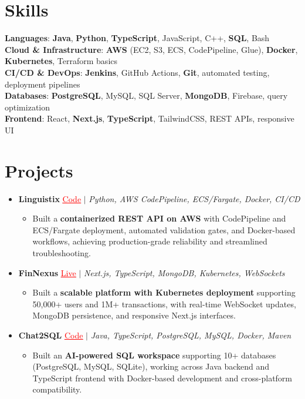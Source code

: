 \documentclass[letterpaper,10pt]{article}
\newcommand{\resumeItem}[1]{\item\small{{#1 \vspace{-2pt}}}}
\newcommand{\resumeProjectHeading}[1]{\item \small #1 \vspace{-2pt}}
\newcommand{\resumeSubHeadingListStart}{\begin{itemize}[leftmargin=0.0in, label={}]}
\newcommand{\resumeSubHeadingListEnd}{\end{itemize}}
\newcommand{\resumeProjItemListStart}{\begin{itemize}[leftmargin=0.15in,label=\textbullet,itemsep=0pt,topsep=0pt,parsep=0pt,partopsep=0pt]}
\newcommand{\resumeProjItemListEnd}{\end{itemize}\vspace{-4pt}}
\begin{document}
\section{Skills}
\begin{itemize}[leftmargin=0.15in, label={}]
\small{\item{
\textbf{Languages}: \textbf{Java}, \textbf{Python}, \textbf{TypeScript}, JavaScript, C++, \textbf{SQL}, Bash \\
\textbf{Cloud \& Infrastructure}: \textbf{AWS} (EC2, S3, ECS, CodePipeline, Glue), \textbf{Docker}, \textbf{Kubernetes}, Terraform basics \\
\textbf{CI/CD \& DevOps}: \textbf{Jenkins}, GitHub Actions, \textbf{Git}, automated testing, deployment pipelines \\
\textbf{Databases}: \textbf{PostgreSQL}, MySQL, SQL Server, \textbf{MongoDB}, Firebase, query optimization \\
\textbf{Frontend}: React, \textbf{Next.js}, \textbf{TypeScript}, TailwindCSS, REST APIs, responsive UI
}}
\end{itemize}
\vspace{-16pt}
\section{Projects}
\resumeSubHeadingListStart
\vspace{-2pt}
\resumeProjectHeading{\textbf{Linguistix} {\href{https://github.com/SAHAJ-BHADJA/Linguistix}{\textcolor{red}{\underline{Code}}}} $|$ \emph{Python, AWS CodePipeline, ECS/Fargate, Docker, CI/CD}}
\resumeProjItemListStart
\resumeItem{Built a \textbf{containerized REST API on AWS} with CodePipeline and ECS/Fargate deployment, automated validation gates, and Docker-based workflows, achieving production-grade reliability and streamlined troubleshooting.}
\resumeProjItemListEnd
\vspace{3pt}
\resumeProjectHeading{\textbf{FinNexus} {\href{https://fin-nexus.vercel.app/}{\textcolor{red}{\underline{Live}}}} $|$ \emph{Next.js, TypeScript, MongoDB, Kubernetes, WebSockets}}
\resumeProjItemListStart
\resumeItem{Built a \textbf{scalable platform with Kubernetes deployment} supporting 50,000+ users and 1M+ transactions, with real-time WebSocket updates, MongoDB persistence, and responsive Next.js interfaces.}
\resumeProjItemListEnd
\vspace{3pt}
\resumeProjectHeading{\textbf{Chat2SQL} {\href{https://github.com/SAHAJ-BHADJA/Chat2SQL}{\textcolor{red}{\underline{Code}}}} $|$ \emph{Java, TypeScript, PostgreSQL, MySQL, Docker, Maven}}
\resumeProjItemListStart
\resumeItem{Built an \textbf{AI-powered SQL workspace} supporting 10+ databases (PostgreSQL, MySQL, SQLite), working across Java backend and TypeScript frontend with Docker-based development and cross-platform compatibility.}
\resumeProjItemListEnd
\resumeSubHeadingListEnd
\end{document}
